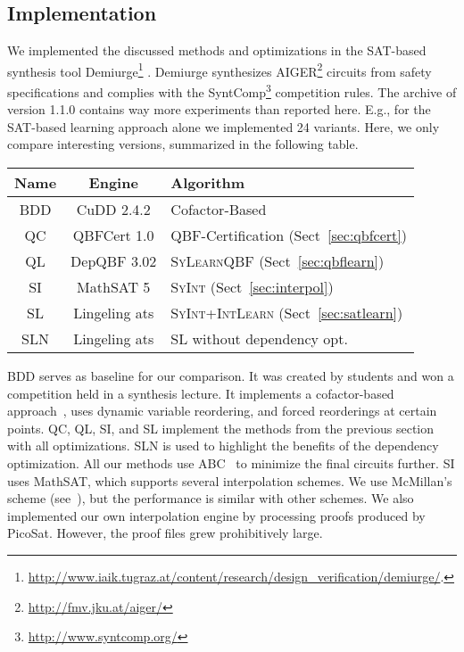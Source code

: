 \documentclass[conference]{IEEEtran}
\newcommand{\depqbf}{\textsf{DepQBF}\xspace}
\newcommand{\demiurge}{\textsf{Demiurge}\xspace}
\newcommand{\lingeling}{\textsf{Lingeling}\xspace}
\newcommand{\picosat}{\textsf{PicoSat}\xspace}
\newcommand{\mathsat}{\textsf{MathSAT}\xspace}
\newcommand{\qbfcert}{\textsf{QBFCert}\xspace}
\newcommand{\cudd}{\textsf{CuDD}\xspace}
\newcommand{\Abc}{\textsf{ABC}\xspace}
\newcommand{\aiger}{\textsf{AIGER}\xspace}
\begin{document}
\subsection{Implementation}
We implemented the discussed methods and optimizations in the SAT-based 
synthesis tool \demiurge \footnote{\url{
http://www.iaik.tugraz.at/content/research/design_verification/demiurge/}.}
\cite{BloemKS14}.  \demiurge synthesizes 
\aiger\footnote{\url{http://fmv.jku.at/aiger/}} circuits from safety 
specifications and complies with the 
\textsf{SyntComp}\footnote{\url{http://www.syntcomp.org/}} competition rules. 
The archive of version 1.1.0 contains way more experiments than reported here. 
E.g., for the SAT-based learning approach alone we implemented 24 variants.  
Here, we only compare interesting versions, summarized in the following table.
\begin{center}
\begin{tabular}{c|c|l}
Name & Engine       & Algorithm\\
\hline
\textsf{BDD}&\cudd  2.4.2   & Cofactor-Based~\cite{BloemGJPPW07}\\
\textsf{QC} &\qbfcert 1.0   & QBF-Certification (Sect~\ref{sec:qbfcert})\\
\textsf{QL} &\depqbf  3.02  & \textsc{SyLearnQBF} (Sect~\ref{sec:qbflearn})\\
\textsf{SI} &\mathsat 5     & \textsc{SyInt} (Sect~\ref{sec:interpol})\\
\textsf{SL} &\lingeling ats & \textsc{SyInt}+\textsc{IntLearn}
                               (Sect~\ref{sec:satlearn})\\
\textsf{SLN}&\lingeling ats & SL without dependency opt.
\end{tabular}
\end{center}
\textsf{BDD} serves as baseline for our comparison. It was created by students 
and won a competition held in a synthesis lecture. It implements a 
cofactor-based approach~\cite{BloemGJPPW07}, uses dynamic variable reordering, 
and forced reorderings at certain points. \textsf{QC}, \textsf{QL}, \textsf{SI}, 
and \textsf{SL} implement the methods from the previous section with all 
optimizations.  \textsf{SLN} is used to highlight the benefits of the dependency 
optimization.  All our methods use \Abc\footnotemark[5]~\cite{BraytonM10} to 
minimize the final circuits further.  \textsf{SI} uses \mathsat, which supports 
several interpolation schemes. We use McMillan's scheme 
(see~\cite{DSilvaKPW10}), but the performance is similar with other schemes.  We 
also implemented our own interpolation engine by processing proofs produced by 
\picosat.  However, the proof files grew prohibitively large.
\end{document}

